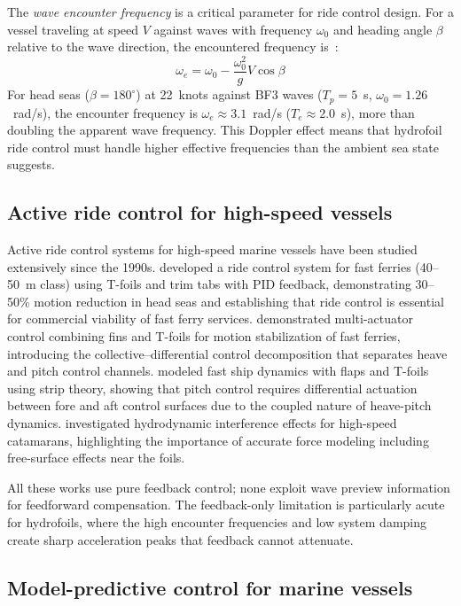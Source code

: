 \documentclass[review]{elsarticle}
\begin{document}
The \emph{wave encounter frequency} is a critical parameter for
ride control design.  For a vessel traveling at speed $V$ against
waves with frequency $\omega_0$ and heading angle $\beta$ relative
to the wave direction, the encountered frequency
is~\citep{faltinsen2005}:
\begin{equation}
  \omega_e = \omega_0 - \frac{\omega_0^2}{g} V \cos\beta
  \label{eq:encounter}
\end{equation}
For head seas ($\beta = 180^\circ$) at 22~knots against BF3 waves
($T_p = 5$~s, $\omega_0 = 1.26$~rad/s), the encounter frequency is
$\omega_e \approx 3.1$~rad/s ($T_e \approx 2.0$~s), more than doubling the
apparent wave frequency.
This Doppler effect means that hydrofoil ride control must handle
higher effective frequencies than the ambient sea state suggests.

\subsection{Active ride control for high-speed vessels}

Active ride control systems for high-speed marine vessels have been
studied extensively since the 1990s.
\citet{haywood1995} developed a ride control system for fast ferries
(40--50~m class) using T-foils and trim tabs with PID feedback,
demonstrating 30--50\% motion reduction in head seas and establishing
that ride control is essential for commercial viability of fast ferry
services.
\citet{giron2001} demonstrated multi-actuator
control combining fins and T-foils for motion stabilization of fast
ferries, introducing the collective--differential control decomposition
that separates heave and pitch control channels.
\citet{esteban2005} modeled fast ship dynamics with
flaps and T-foils using strip theory, showing that pitch control
requires differential actuation between fore and aft control surfaces
due to the coupled nature of heave-pitch dynamics.
\citet{broglia2014} investigated hydrodynamic interference effects
for high-speed catamarans, highlighting the importance of accurate
force modeling including free-surface effects near the foils.

All these works use pure feedback control; none exploit
wave preview information for feedforward compensation.
The feedback-only limitation is particularly acute for hydrofoils,
where the high encounter frequencies and low system damping create
sharp acceleration peaks that feedback cannot attenuate.

\subsection{Model-predictive control for marine vessels}
\end{document}
